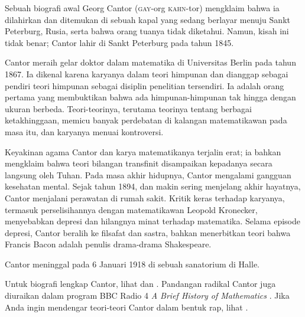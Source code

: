 \documentclass[../../../include/open-logic-section]{subfiles}
\begin{document}



Sebuah biografi awal Georg Cantor (\textsc{gay}-org
\textsc{kahn}-tor) mengklaim bahwa ia dilahirkan dan ditemukan di sebuah
kapal yang sedang berlayar menuju Sankt Peterburg, Rusia, serta bahwa orang
tuanya tidak diketahui. Namun, kisah ini tidak benar; Cantor lahir di Sankt
Peterburg pada tahun 1845.

Cantor meraih gelar doktor dalam matematika di Universitas Berlin pada tahun
1867. Ia dikenal karena karyanya dalam teori himpunan dan dianggap sebagai
pendiri teori himpunan sebagai disiplin penelitian tersendiri. Ia adalah
orang pertama yang membuktikan bahwa ada himpunan-himpunan tak hingga dengan
ukuran berbeda. Teori-teorinya, terutama teorinya tentang berbagai ketakhinggaan,
memicu banyak perdebatan di kalangan matematikawan pada masa itu, dan
karyanya menuai kontroversi.

Keyakinan agama Cantor dan karya matematikanya terjalin erat; ia bahkan
mengklaim bahwa teori bilangan transfinit disampaikan kepadanya secara
langsung oleh Tuhan. Pada masa akhir hidupnya, Cantor mengalami gangguan
kesehatan mental. Sejak tahun 1894, dan makin sering menjelang akhir
hayatnya, Cantor menjalani perawatan di rumah sakit. Kritik keras terhadap
karyanya, termasuk perselisihannya dengan matematikawan Leopold Kronecker,
menyebabkan depresi dan hilangnya minat terhadap matematika. Selama episode
depresi, Cantor beralih ke filsafat dan sastra, bahkan menerbitkan teori
bahwa Francis Bacon adalah penulis drama-drama Shakespeare.

Cantor meninggal pada 6 Januari 1918 di sebuah sanatorium di Halle.

\begin{reading}
Untuk biografi lengkap Cantor, lihat \citet{Dauben1990} dan
\citet{Grattan-Guinness1971}. Pandangan radikal Cantor juga diuraikan dalam
program BBC Radio 4 \emph{A Brief History of Mathematics}
\citep{Sautoy2014}. Jika Anda ingin mendengar teori-teori Cantor dalam
bentuk rap, lihat \citet{Rose2012}.
\end{reading}
\end{document}
